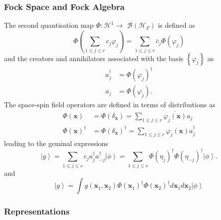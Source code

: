 \documentclass[aps,preprint]{revtex4}%
\begin{document}
\subsubsection{Fock Space and Fock Algebra}

The second quantisation map $\Phi:\mathcal{H}^{1}\rightarrow$ $\mathcal{B}%
\left(  \mathcal{H}_{F}\right)  $ is defined as%
\begin{equation}
\Phi\left(  \sum_{1\leq j\leq r}c_{j}\varphi_{j}\right)  =\sum_{1\leq j\leq
r}\bar{c}_{j}\Phi\left(  \varphi_{j}\right)
\end{equation}
and the creators and annihilators associated with the basis $\left\{
\varphi_{j}\right\}  $ as
\begin{align}
a_{j}^{\dagger}  &  =\Phi\left(  \varphi_{j}\right)  ^{\dagger}\nonumber\\
a_{j}  &  =\Phi\left(  \varphi_{j}\right)  .
\end{align}
The space-spin field operators are defined in terms of distributions as
\begin{align}
\Phi\left(  \mathbf{x}\right)   &  =\Phi\left(  \delta_{\mathbf{x}}\right)
=\sum_{1\leq j\leq r}\overline{\varphi_{j}\left(  \mathbf{x}\right)  }%
a_{j}\nonumber\\
\Phi\left(  \mathbf{x}\right)  ^{\dagger}  &  =\Phi\left(  \delta_{\mathbf{x}%
}\right)  ^{\dagger}=\sum_{1\leq j\leq r}\varphi_{j}\left(  \mathbf{x}\right)
a_{j}^{\dagger}%
\end{align}
leading to the geminal expressions%
\begin{equation}
\left\vert g\right\rangle =\sum_{1\leq j\leq s}c_{j}a_{j}^{\dagger}%
a_{-j}^{\dagger}\left\vert \phi\right\rangle =\sum_{1\leq j\leq s}\Phi\left(
\eta_{j}\right)  ^{\dagger}\Phi\left(  \eta_{-j}\right)  ^{\dagger}\left\vert
\phi\right\rangle .
\end{equation}
and%
\begin{equation}
\left\vert g\right\rangle =\int g\left(  \mathbf{x}_{1},\mathbf{x}_{2}\right)
\Phi\left(  \mathbf{x}_{1}\right)  ^{\dagger}\Phi\left(  \mathbf{x}%
_{2}\right)  ^{\dagger}d\mathbf{x}_{1}d\mathbf{x}_{2}\left\vert \phi
\right\rangle
\end{equation}


\subsubsection{Representations}
\end{document}
